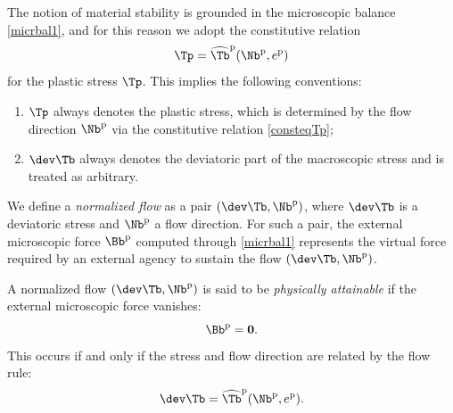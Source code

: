 %
%
%
The notion of material stability is grounded in the microscopic balance
\eqref{micrbal1}, and for this reason we adopt the constitutive relation
\begin{equation}\label{consteqTp}
	\Tp = \widehat{\Tb}^{\rm p}(\Nb^{\rm p}, e^{\rm p})
\end{equation}
for the plastic stress $\Tp$. This implies the following conventions:
\begin{enumerate}
	\item $\Tp$ always denotes the plastic stress, which is determined by the flow direction $\Nb^{\rm p}$ via the constitutive relation \eqref{consteqTp};
	\item $\dev \Tb$ always denotes the deviatoric part of the macroscopic stress and is treated as arbitrary.
\end{enumerate}

We define a \emph{normalized flow} as a pair $(\dev\Tb, \Nb^{\rm p})$, where $\dev\Tb$ is a deviatoric stress and $\Nb^{\rm p}$ a flow direction. For such a pair, the external microscopic force $\Bb^{\rm p}$ computed through \eqref{micrbal1} represents the virtual force required by an external agency to sustain the flow $(\dev\Tb, \Nb^{\rm p})$.

A normalized flow $(\dev\Tb, \Nb^{\rm p})$ is said to be \emph{physically attainable} if the external microscopic force vanishes:
\begin{equation}
	\Bb^{\rm p} = \mathbf{0}.
\end{equation}
This occurs if and only if the stress and flow direction are related by the flow rule:
\begin{equation}\label{flowrule}
	\dev \Tb = \widehat{\Tb}^{\rm p}(\Nb^{\rm p}, e^{\rm p}).
\end{equation}

